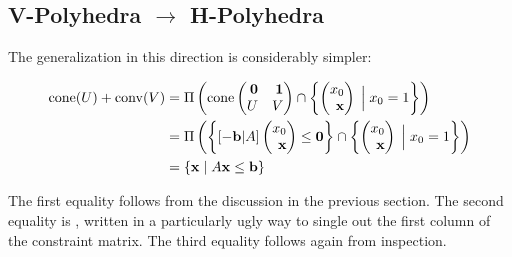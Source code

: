 \subsection{V-Polyhedra $\to$ H-Polyhedra}

The generalization in this direction is considerably simpler:

\begin{align*} 
\cone(U) + \conv(V)
    &= \Pi\left(\cone\pmb \0 & \1 \\ U & V\pme \cap\hpxz\right)\\
    &= \Pi\left(\left\{
      [-\vec{b}|A]\xx\leq\0\right
      \}\cap\hpxz\right) \\
    &= \{\x\st A\x\leq\vec{b}\}
\end{align*}

The first equality follows from the discussion in the previous section.  The second equality is , written in a particularly ugly way to single out the first column of the constraint matrix.  The third equality follows again from inspection.

